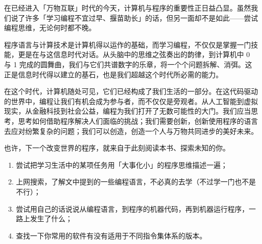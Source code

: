 在已经进入「万物互联」时代的今天，计算机与程序的重要性正日益凸显。虽然我们说了许多「学习编程不宜过早、揠苗助长」的话，但另一面却不是如此——尝试编程思维，无论何时都不晚。

程序语言与计算技术是计算机得以运作的基础，而学习编程，不仅仅是掌握一门技能，更是在与这信息时代对话。从头脑中的思维之弦奏出的韵律，到计算机中 0 与 1 完成的圆舞曲，我们与它们共谱数字的乐章，将一个个问题拆解、消弭。这正是信息时代得以建立的基石，也是我们超越这个时代所必需的能力。

在这个时代，计算机随处可见，它们已经构成了我们生活的一部分。在这代码驱动的世界中，编程让我们有机会成为参与者，而不仅仅是旁观者。从人工智能到虚拟现实，从金融科技到社会公益，编程为我们打开了无数可能性的大门。我们应当思考，思考如何借助程序解决人们面临的挑战；我们需要创新，创新使用程序的语言去应对纷繁复杂的问题；我们可以创造，创造一个人与万物共同进步的美好未来。

也许，下一个改变世界的程序，就来自于此刻阅读本书、探索未知的你。

\practice

\begin{enumerate}
  \item 尝试把学习生活中的某项任务用「大事化小」的程序思维描述一遍；
  \item 上网搜索，了解文中提到的一些编程语言，不必真的去学（不过学一门也不是不行）；
  \item 尝试用自己的话说说从编程语言，到程序的机器代码，再到机器运行程序，一路上发生了什么；
  \item 查找一下你常用的软件有没有适用于不同指令集体系的版本。
\end{enumerate}